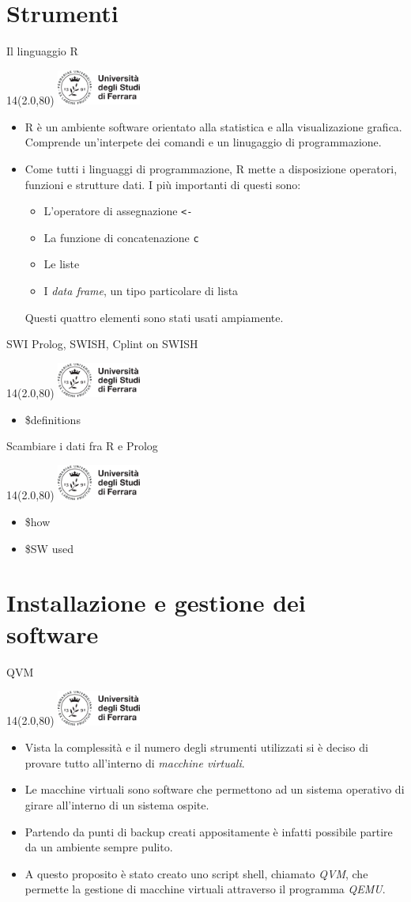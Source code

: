 \documentclass[11pt,xcolor={dvipsnames},default]{beamer} %
\newcommand{\MyLogo}{%
\begin{textblock}{14}(2.0,80)
 \includegraphics[height=1.15cm, angle=0]{logo}
\end{textblock}
}
\begin{document}
\section{Strumenti}
\begin{frame}{Il linguaggio R}
\transboxin
\MyLogo
\begin{itemize}
\item R è un ambiente software orientato alla statistica e alla visualizazione 
grafica. Comprende un'interpete dei comandi e un linugaggio di programmazione.
\item Come tutti i linguaggi di programmazione, R mette a disposizione 
operatori, funzioni e strutture dati. I più importanti di questi sono:
\begin{itemize}
\item L'operatore di assegnazione \texttt{<-}
\item La funzione di concatenazione \texttt{c}
\item Le liste
\item I \emph{data frame}, un tipo particolare di lista
\end{itemize}
Questi quattro elementi sono stati usati ampiamente.
\end{itemize}
\end{frame}

\begin{frame}{SWI Prolog, SWISH, Cplint on SWISH}
\transboxin
\MyLogo
\begin{itemize}
\item \$definitions
\end{itemize}
\end{frame}

\begin{frame}{Scambiare i dati fra R e Prolog}
\transboxin
\MyLogo
\begin{itemize}
\item \$how
\item \$SW used
\end{itemize}
\end{frame}

\section{Installazione e gestione dei software}
\begin{frame}{QVM}
\transboxin
\MyLogo
\begin{itemize}
\item Vista la complessità e il numero degli strumenti utilizzati si è deciso 
di provare tutto all'interno di \emph{macchine virtuali}.
\item Le macchine virtuali sono software che permettono ad un sistema 
operativo di girare all'interno di un sistema ospite.
\item Partendo da punti di backup creati appositamente è infatti possibile 
partire da un ambiente sempre pulito.
\item A questo proposito è stato creato uno script shell, chiamato \emph{QVM}, 
che permette la gestione di macchine virtuali attraverso il programma 
\emph{QEMU}.
\end{itemize}
\end{frame}
\end{document}
